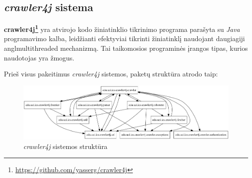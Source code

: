 \subsection{\textit{crawler4j} sistema}
\textbf{crawler4j\footnote{\url{https://github.com/yasserg/crawler4j}}} yra atvirojo kodo
žiniatinklio tikrinimo  programa parašyta su \textit{Java} programavimo kalba, leidžianti
efektyviai tikrinti žiniatinklį naudojant daugiagiji angl{multithreaded} mechanizmą.
Tai taikomosios programinės įrangos tipas, kurios naudotojas yra žmogus.

Prieš visus pakeitimus \textit{crawler4j} sistemos, paketų struktūra atrodo taip:
\begin{figure}[H]
    \centering
    \includegraphics[scale=0.5]{img/crawler_packages_orig}
    \caption{\textit{crawler4j} sistemos struktūra}
    \label{img:crawler_packages_orig}
\end{figure}

